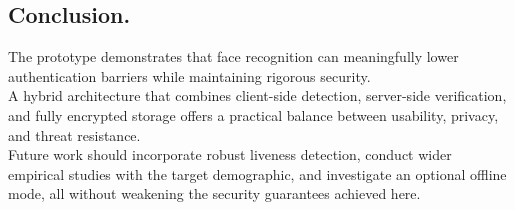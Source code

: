 \subsection{Conclusion.}
The prototype demonstrates that face recognition can meaningfully lower authentication barriers while maintaining rigorous security. \\ 
A hybrid architecture that combines client-side detection, server-side verification, and fully encrypted storage offers a practical balance between usability, privacy, and threat resistance. \\ 
Future work should incorporate robust liveness detection, conduct wider empirical studies with the target demographic, and investigate an optional offline mode, all without weakening the security guarantees achieved here.\\
